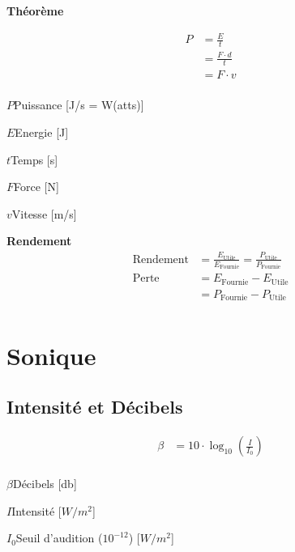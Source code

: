 \documentclass[12pt,a4paper]{article} %
\newcommand\frametitle[1]{ {\bfseries #1} \\[5pt] }
\begin{document}
\begin{mdframed}
	\frametitle{Théorème}

	\begin{twocols}
		\begin{align*}
			P &= \frac{E}{t} \\
			  &= \frac{F \cdot d}{t} \\
			  &= F \cdot v \\[1em]
		\end{align*}
	\nextcol
		\begin{vardef}
			\item{$P$}{Puissance [J/s = W(atts)]}
			\item{$E$}{Energie [J]}
			\item{$t$}{Temps [s]}
			\item{$F$}{Force [N]}
			\item{$v$}{Vitesse [m/s]}
		\end{vardef}
	\end{twocols}
\end{mdframed}
\vspace{1em}
\begin{mdframed}
	\frametitle{Rendement}
	\begin{align*}
		\text{Rendement} &= \frac{E_\text{Utile}}{E_\text{Fournie}} = \frac{P_\text{Utile}}{P_\text{Fournie}} \\[1em]
		\text{Perte} &= E_\text{Fournie} - E_\text{Utile} \\
		&= P_\text{Fournie} - P_\text{Utile} \\
	\end{align*}

\end{mdframed}

\newpage

\section{Sonique}

\subsection{Intensité et Décibels}
\begin{twocols}
	\begin{align*}
		\beta &= 10 \cdot \log_{10}\left(\frac{I}{I_0}\right) \\
	\end{align*}
\nextcol
	\begin{vardef}
		\item{$\beta$}{Décibels [db]}
		\item{$I$}{Intensité [$W/m^2$]}
		\item{$I_0$}{Seuil d'audition ($10^{-12}$) [$W/m^2$]}
	\end{vardef}
\end{twocols}
\end{document}
